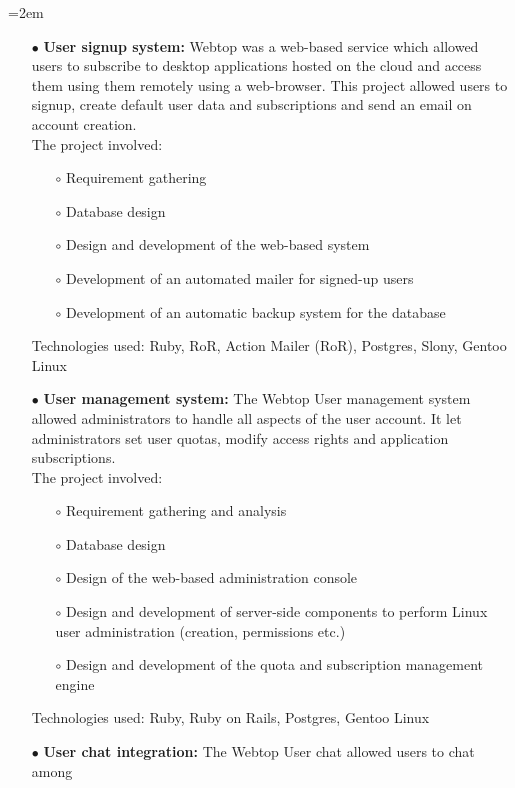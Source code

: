 \documentclass{scrartcl}
\newcommand{\MarginDate}[1]{\marginpar{\raggedleft\itshape\small#1}}
\newcommand{\Description}[1]{\hangindent=2em\hangafter=0\noindent\raggedright\footnotesize{#1}\par\normalsize}
\begin{document}
\begin{cv}{
\href{http://www.develmj.com}{}
}
\Description{
\begin{itemize}
\item[\footnotesize$\bullet$] \textbf{User signup system: }Webtop was a web-based service which \MarginDate{Atlantis Webtop}allowed users to
    subscribe to desktop applications hosted on the cloud and access them using
    them remotely using a web-browser. This project allowed users to signup,
    create default user data and subscriptions and send an email on account
    creation.\\
    The project involved:
{\scriptsize
    \begin{itemize}
    \item[\footnotesize$\circ$] Requirement gathering
    \item[\footnotesize$\circ$] Database design
    \item[\footnotesize$\circ$] Design and development of the
      web-based system
    \item[\footnotesize$\circ$] Development of an automated mailer for
      signed-up users
    \item[\footnotesize$\circ$] Development of an automatic backup
      system for the database
    \end{itemize}}
    Technologies used: Ruby, RoR, Action Mailer (RoR), Postgres, Slony,
Gentoo Linux
  \item[\footnotesize$\bullet$] \textbf{User management system: }The Webtop User management system allowed
administrators to handle all aspects of the user account. It let administrators
set user quotas, modify access rights and application subscriptions.\\
The project involved:
{\scriptsize
    \begin{itemize}
    \item[\footnotesize$\circ$] Requirement gathering and analysis
    \item[\footnotesize$\circ$] Database design
    \item[\footnotesize$\circ$] Design of the web-based administration console
    \item[\footnotesize$\circ$] Design and development of server-side components to perform Linux
      user administration (creation, permissions etc.)
    \item[\footnotesize$\circ$] Design and development of the quota and subscription management
engine
    \end{itemize}}
    Technologies used: Ruby, Ruby on Rails, Postgres, Gentoo Linux
  \item[\footnotesize$\bullet$] \textbf{User chat integration: }The Webtop User chat allowed users to chat among

\end{itemize}}
\end{cv}
\end{document}
